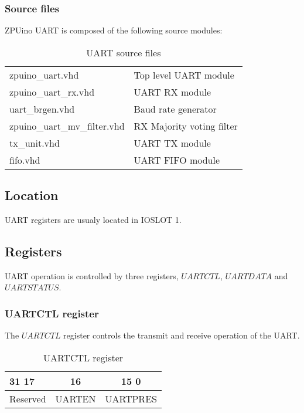 \subsubsection{Source files}

ZPUino UART is composed of the following source modules:

\begin{table}[h!]
\begin{center}
\begin{tabularx}{10cm}{ll}

zpuino\_uart.vhd & Top level UART module \\
zpuino\_uart\_rx.vhd & UART RX module \\
uart\_brgen.vhd & Baud rate generator \\
zpuino\_uart\_mv\_filter.vhd & RX Majority voting filter \\
tx\_unit.vhd & UART TX module \\
fifo.vhd & UART FIFO module

\end{tabularx}
\end{center}
\caption{UART source files}
\end{table}



\subsection{Location}

UART registers are usualy located in IOSLOT 1.

\subsection{Registers}
UART operation is controlled by three registers, $UARTCTL$, $UARTDATA$ and \\
$UARTSTATUS$.

\subsubsection{UARTCTL register}
The $UARTCTL$ register controls the transmit and receive operation of the UART.

\begin{table}[h!]
\begin{center}
\begin{tabularx}{14cm}{Xcc}
31 \hfill 17 & 16 & 15 \hfill 0  \\
\hline
\multicolumn{1}{|c|}{Reserved} & 
\multicolumn{1}{|c|}{UARTEN} & 
\multicolumn{1}{|c|}{UARTPRES} \\
\hline
\end{tabularx}
\caption{UARTCTL register}\label{UARTCTL}
\end{center}
\end{table}

